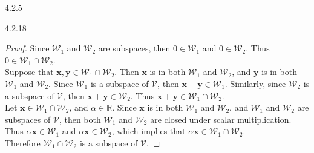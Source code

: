 \documentclass{article}
\theoremstyle{definition}
\begin{document}
\begin{prob}{4.2.5}
    \end{prob}

    \begin{prob}{4.2.18} $ $
        \begin{proof}
            Since $\mathcal{W}_1$ and $\mathcal{W}_2$ are subspaces, then $0 \in \mathcal{W}_1$ and $0 \in \mathcal{W}_2$. Thus $0 \in \mathcal{W}_1 \cap \mathcal{W}_2$. \\

            Suppose that $\mathbf{x}, \mathbf{y} \in \mathcal{W}_1 \cap \mathcal{W}_2$. Then $\mathbf{x}$ is in both $\mathcal{W}_1$ and $\mathcal{W}_2$, and $\mathbf{y}$ is in both $\mathcal{W}_1$ and $\mathcal{W}_2$. Since $\mathcal{W}_1$ is a subspace of $\mathcal{V}$, then $\mathbf{x}+\mathbf{y} \in \mathcal{W}_1$. Similarly, since $\mathcal{W}_2$ is a subspace of $\mathcal{V}$, then $\mathbf{x}+\mathbf{y} \in \mathcal{W}_2$. Thus $\mathbf{x}+\mathbf{y} \in \mathcal{W}_1 \cap \mathcal{W}_2$.\\

            Let $\mathbf{x} \in \mathcal{W}_1 \cap \mathcal{W}_2$, and $\alpha \in \mathbb{R}$. Since $\mathbf{x}$ is in both $\mathcal{W}_1$ and $\mathcal{W}_2$, and $\mathcal{W}_1$ and $\mathcal{W}_2$ are subspaces of $\mathcal{V}$, then both $\mathcal{W}_1$ and $\mathcal{W}_2$ are closed under scalar multiplication. Thus $\alpha \mathbf{x} \in \mathcal{W}_1$ and $\alpha \mathbf{x} \in \mathcal{W}_2$, which implies that $\alpha \mathbf{x} \in \mathcal{W}_1 \cap \mathcal{W}_2$.\\

            Therefore $\mathcal{W}_1 \cap \mathcal{W}_2$ is a subspace of $\mathcal{V}$.
        \end{proof}
    \end{prob}
\end{document}
